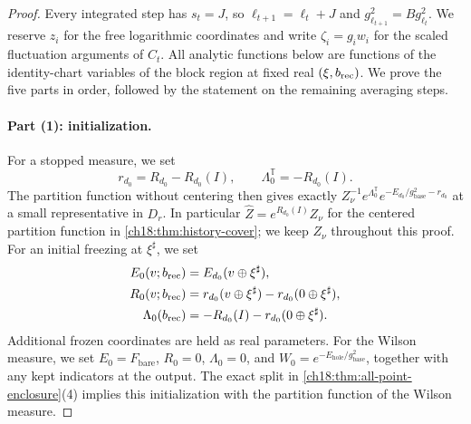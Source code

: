\begin{proof}
Every integrated step has $s_t=J$, so $\ell_{t+1}=\ell_t+J$ and $g_{\ell_{t+1}}^2=Bg_{\ell_t}^2$. We reserve $z_i$ for the free logarithmic coordinates and write $\zeta_i=g_iw_i$ for the scaled fluctuation arguments of $C_t$. All analytic functions below are functions of the identity-chart variables of the block region at fixed real $(\xi,b_{\mathrm{rec}})$. We prove the five parts in order, followed by the statement on the remaining averaging steps.

\paragraph{Part (1): initialization.}
For a stopped measure, we set
\[
 r_{d_0}=R_{d_0}-R_{d_0}(I),\qquad
 \Lambda_0^{\mathbb T}=-R_{d_0}(I).
\]
The partition function without centering then gives exactly $Z_\nu^{-1}e^{\Lambda_0^{\mathbb T}}e^{-E_{d_0}/g_{\mathrm{base}}^2-r_{d_0}}$ at a small representative in $D_r$. In particular $\widehat Z=e^{R_{d_0}(I)}Z_\nu$ for the centered partition function in \cref{ch18:thm:history-cover}; we keep $Z_\nu$ throughout this proof. For an initial freezing at $\xi^\sharp$, we set
\begin{equation}\label{ch18:eq:initial-scalar}
 \begin{split}
 E_0(v;b_{\mathrm{rec}})&=E_{d_0}(v\oplus\xi^\sharp),\\
 R_0(v;b_{\mathrm{rec}})&=r_{d_0}(v\oplus\xi^\sharp)
                         -r_{d_0}(0\oplus\xi^\sharp),\\
 \Lambda_0(b_{\mathrm{rec}})&=-R_{d_0}(I)
                         -r_{d_0}(0\oplus\xi^\sharp).
 \end{split}
\end{equation}
Additional frozen coordinates are held as real parameters. For the Wilson measure, we set $E_0=F_{\mathrm{bare}}$, $R_0=0$, $\Lambda_0=0$, and $W_0=e^{-E_{\mathrm{hole}}/g_{\mathrm{base}}^2}$, together with any kept indicators at the output. The exact split in \cref{ch18:thm:all-point-enclosure}(4) implies this initialization with the partition function of the Wilson measure.


\end{proof}
